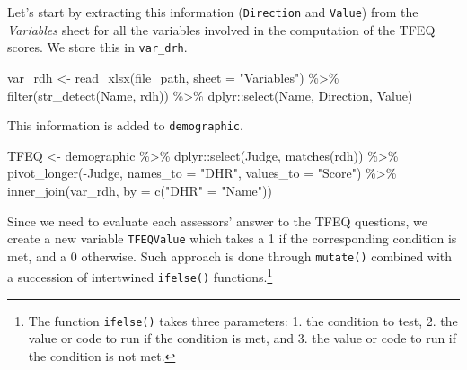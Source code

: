 \documentclass[
]{krantz}
\makeatletter
\newenvironment{Shaded}{\begin{snugshade}}{\end{snugshade}}
\newcommand{\AttributeTok}[1]{\textcolor[rgb]{0.61,0.61,0.61}{#1}}
\newcommand{\FunctionTok}[1]{\textcolor[rgb]{0,0,0}{#1}}
\newcommand{\NormalTok}[1]{#1}
\newcommand{\OtherTok}[1]{\textcolor[rgb]{0.37,0.37,0.37}{#1}}
\newcommand{\SpecialCharTok}[1]{\textcolor[rgb]{0,0,0}{#1}}
\newcommand{\StringTok}[1]{\textcolor[rgb]{0.5,0.5,0.5}{#1}}
\newenvironment{kframe}{%
\medskip{}
\setlength{\fboxsep}{.8em}
 \def\at@end@of@kframe{}%
 \ifinner\ifhmode%
  \def\at@end@of@kframe{\end{minipage}}%
  \begin{minipage}{\columnwidth}%
 \fi\fi%
 \def\FrameCommand##1{\hskip\@totalleftmargin \hskip-\fboxsep
 \colorbox{shadecolor}{##1}\hskip-\fboxsep
     \hskip-\linewidth \hskip-\@totalleftmargin \hskip\columnwidth}%
 \MakeFramed {\advance\hsize-\width
   \@totalleftmargin\z@ \linewidth\hsize
   \@setminipage}}%
 {\par\unskip\endMakeFramed%
 \at@end@of@kframe}
\renewenvironment{Shaded}{\begin{kframe}}{\end{kframe}}
\makeatother
\begin{document}
Let's start by extracting this information (\texttt{Direction} and \texttt{Value}) from the \emph{Variables} sheet for all the variables involved in the computation of the TFEQ scores. We store this in \texttt{var\_drh}.

\begin{Shaded}
\begin{Highlighting}[]
\NormalTok{var\_rdh }\OtherTok{\textless{}{-}} \FunctionTok{read\_xlsx}\NormalTok{(file\_path, }\AttributeTok{sheet =} \StringTok{"Variables"}\NormalTok{) }\SpecialCharTok{\%\textgreater{}\%}
  \FunctionTok{filter}\NormalTok{(}\FunctionTok{str\_detect}\NormalTok{(Name, rdh)) }\SpecialCharTok{\%\textgreater{}\%}
\NormalTok{  dplyr}\SpecialCharTok{::}\FunctionTok{select}\NormalTok{(Name, Direction, Value)}
\end{Highlighting}
\end{Shaded}

This information is added to \texttt{demographic}.

\begin{Shaded}
\begin{Highlighting}[]
\NormalTok{TFEQ }\OtherTok{\textless{}{-}}\NormalTok{ demographic }\SpecialCharTok{\%\textgreater{}\%}
\NormalTok{  dplyr}\SpecialCharTok{::}\FunctionTok{select}\NormalTok{(Judge, }\FunctionTok{matches}\NormalTok{(rdh)) }\SpecialCharTok{\%\textgreater{}\%}
  \FunctionTok{pivot\_longer}\NormalTok{(}\SpecialCharTok{{-}}\NormalTok{Judge, }\AttributeTok{names\_to =} \StringTok{"DHR"}\NormalTok{, }\AttributeTok{values\_to =} \StringTok{"Score"}\NormalTok{) }\SpecialCharTok{\%\textgreater{}\%}
  \FunctionTok{inner\_join}\NormalTok{(var\_rdh, }\AttributeTok{by =} \FunctionTok{c}\NormalTok{(}\StringTok{"DHR"} \OtherTok{=} \StringTok{"Name"}\NormalTok{))}
\end{Highlighting}
\end{Shaded}

Since we need to evaluate each assessors' answer to the TFEQ questions, we create a new variable \texttt{TFEQValue} which takes a 1 if the corresponding condition is met, and a 0 otherwise. Such approach is done through \texttt{mutate()} combined with a succession of intertwined \texttt{ifelse()} functions.\footnote{The function \texttt{ifelse()} takes three parameters: 1. the condition to test, 2. the value or code to run if the condition is met, and 3. the value or code to run if the condition is not met.}
\end{document}
